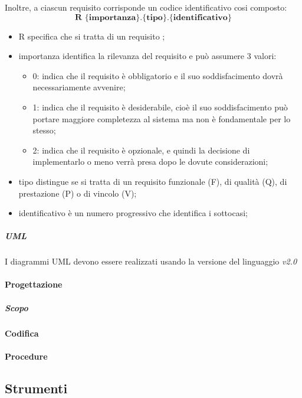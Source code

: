 Inoltre, a ciascun requisito corrisponde un codice identificativo cosi composto: 
$$ \textbf{R \{importanza\}.\{tipo\}.\{identificativo\}  } $$ 
\begin{itemize}
	\item R specifica che si tratta di un requisito ; 	
	\item importanza identifica la rilevanza del requisito e può assumere 3 valori:
	\begin{itemize}
		\item 0: indica che il requisito è obbligatorio e il suo soddisfacimento dovrà necessariamente avvenire;  	
		\item 1: indica che il requisito è desiderabile, cioè il suo soddisfacimento può portare maggiore completezza al sistema ma non è fondamentale per lo stesso; 	
		\item 2: indica che il requisito è opzionale, e quindi la decisione di implementarlo o meno verrà presa dopo le dovute considerazioni; 	
	\end{itemize} 	
	\item tipo distingue se si tratta di un requisito funzionale (F), di qualità (Q), di prestazione (P) o di vincolo (V); 	
	\item identificativo è un numero progressivo che identifica i sottocasi; 	
\end{itemize}
\subparagraph{UML}\Spazio
I diagrammi UML devono essere realizzati usando la versione del linguaggio \emph{v2.0}
\paragraph{Progettazione}
\subparagraph{Scopo}\Spazio

\paragraph{Codifica}
\paragraph{Procedure}
\subsection{Strumenti}
\pagebreak